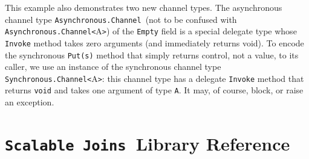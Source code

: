 \documentclass{article}
\newcommand{\sjoins}{{\texttt{Scalable Joins}}}
\newcommand{\dasync}{{\texttt{Asynchronous.Channel}}}
\newcommand{\dasyncA}[1]{{\texttt{Asynchronous.Channel<}#1\texttt{>}}}
\newcommand{\dsyncvoidA}[1]{{\texttt{Synchronous.Channel<}#1\texttt{>}}}
\begin{document}
This example also demonstrates two new channel types.  The
asynchronous channel type \dasync\ (not to be confused with
\dasyncA{A}) of the \verb+Empty+ field is a special delegate type whose
\verb+Invoke+ method takes zero arguments (and immediately returns void).  To encode the synchronous
\verb+Put(s)+ method that simply
returns control, not a value, to its caller, we use an instance of the synchronous
channel type \dsyncvoidA{A}: this channel type has a delegate \verb+Invoke+
method that returns \verb+void+ and takes one argument of type \verb+A+. 
It may, of course, block, or raise an exception.






\section{\sjoins\ Library Reference}
\label{joinsref}
\end{document}
